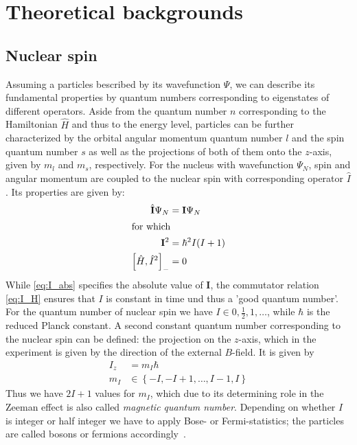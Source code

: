 \section{Theoretical backgrounds}
\subsection{Nuclear spin}
Assuming a particles bescribed by its wavefunction $\Psi$, we can describe 
its fundamental properties by quantum numbers corresponding to eigenstates
of different operators. Aside from the quantum number $n$ corresponding to the 
Hamiltonian $\hat{H}$ and thus to the energy level, particles can be further characterized 
by the orbital angular momentum quantum number $l$ and the spin quantum number 
$s$ as well as the projections of both of them onto the $z$-axis, given by 
$m_l$ and $m_s$, respectively. For the nucleus with wavefunction $\Psi_N$, 
spin and angular momentum are coupled to the 
nuclear spin with corresponding operator $\hat{I}$. Its properties are given by:
\begin{align}
    \hat{\mathbf{I}} \Psi_N &= \mathbf{I} \Psi_N \\ 
\intertext{for which}
    \mathbf{I}^2 &= \hbar^2 I(I + 1)
    \label{eq:I_abs}\\
    \left[\hat{H}, \hat{I}^2\right]_- &= 0 
    \label{eq:I_H}\\
\end{align}
While \eqref{eq:I_abs} specifies the absolute value of $\mathbf{I}$, the commutator relation 
\eqref{eq:I_H} ensures that $I$ is constant in time und thus a 'good quantum number'.
For the quantum number of nuclear spin we have $I \in {0, \frac{1}{2}, 1, \ldots}$, while $\hbar$ is the 
reduced Planck constant. A second constant quantum number corresponding to the nuclear spin can be defined:
the projection on the $z$-axis, which in the experiment is given by the direction of the external $B$-field.
It is given by
\begin{align}
    I_z &= m_I \hbar \\
    m_I &\in \left\{-I, -I + 1, \ldots, I - 1, I\right\}
\end{align}
Thus we have $2I + 1$ values for $m_I$, which due to its determining role in the Zeeman effect is 
also called \emph{magnetic quantum number}. Depending on whether $I$ is integer or half integer
we have to apply Bose- or Fermi-statistics; the particles are called bosons or fermions 
accordingly~\cite{Demtroeder1}.

